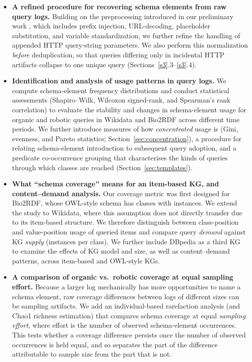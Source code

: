 \documentclass[sw]{iosart2x}
\begin{document}
\begin{itemize}
\item \textbf{A refined procedure for recovering schema elements from raw query logs.} Building on the preprocessing introduced in our preliminary work \cite{mohammadi2024analyzing}, which includes prefix injection, URL-decoding, placeholder substitution, and variable standardization, we further refine the handling of appended HTTP query-string parameters.  We also perform this normalization \emph{before} deduplication, so that queries differing only in incidental HTTP artifacts collapse to one unique query (Sections~\ref{s3}.3--\ref{s3}.4).

\item \textbf{Identification and analysis of usage patterns in query logs.} We compute schema-element frequency distributions and conduct statistical assessments (Shapiro--Wilk, Wilcoxon signed-rank, and Spearman's rank correlation) to evaluate the stability and changes in schema-element usage for organic and robotic queries in Wikidata and Bio2RDF across different time periods. We further introduce measures of how \emph{concentrated} usage is (Gini, evenness, and Pareto statistics; Section~\ref{sec:concentration}), a procedure for relating schema-element introduction to subsequent query adoption, and a predicate co-occurrence grouping that characterises the kinds of queries through which classes are reached (Section~\ref{sec:templates}).

\item \textbf{What ``schema coverage'' means for an item-based KG, and content--demand analysis.} Our coverage metric was first designed for Bio2RDF, whose OWL-style schema has classes with instances. We extend the study to Wikidata, where this assumption does not directly transfer due to its item-based structure. We therefore distinguish between class-position and value-position usage of queried items and compare query \emph{demand} against KG \emph{supply} (instances per class). We further include DBpedia as a third KG to examine the effects of KG model and size, as well as content--demand patterns, across item-based and OWL-style KGs.

\item \textbf{A comparison of organic vs.\ robotic coverage at equal sampling effort.} Because a larger log mechanically has more opportunities to name a schema element, raw coverage differences between logs of different sizes can be sampling artifacts. We add an individual-based rarefaction analysis (and Chao1 richness estimation) that compares schema coverage at equal \emph{sampling effort}, where effort is the number of observed schema-element occurrences. This tests whether a coverage difference persists once the number of observed occurrences is held equal, and so separates the part of the difference attributable to sample size from the part that is not.


\end{itemize}
\end{document}
